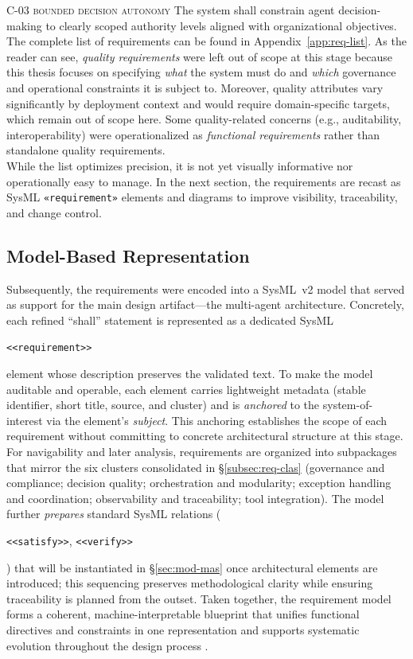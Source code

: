 \noindent \textsc{C-03 bounded decision autonomy} \quad The system shall constrain agent decision-making to clearly scoped authority levels aligned with organizational objectives. \\

The complete list of requirements can be found in Appendix~\ref{app:req-list}. As the reader can see, \emph{quality requirements} were left out of scope at this stage because this thesis focuses on specifying \emph{what} the system must do and \emph{which} governance and operational constraints it is subject to. Moreover, quality attributes vary significantly by deployment context and would require domain-specific targets, which remain out of scope here. Some quality-related concerns (e.g., auditability, interoperability) were operationalized as \emph{functional requirements} rather than standalone quality requirements. \\

While the list optimizes precision, it is not yet visually informative nor operationally easy to manage. In the next section, the requirements are recast as SysML \texttt{«requirement»} elements and diagrams to improve visibility, traceability, and change control.

\subsection{Model-Based Representation}\label{subsec:req-model}
Subsequently, the requirements were encoded into a SysML~v2 model that served as support for the main design artifact---the multi-agent architecture. Concretely, each refined \enquote{shall} statement is represented as a dedicated SysML \begin{footnotesize}\texttt{<<requirement>>}\end{footnotesize} element whose description preserves the validated text. To make the model auditable and operable, each element carries lightweight metadata (stable identifier, short title, source, and cluster) and is \emph{anchored} to the system-of-interest via the element's \emph{subject}. This anchoring establishes the scope of each requirement without committing to concrete architectural structure at this stage. For navigability and later analysis, requirements are organized into subpackages that mirror the six clusters consolidated in §\ref{subsec:req-clas} (governance and compliance; decision quality; orchestration and modularity; exception handling and coordination; observability and traceability; tool integration). The model further \emph{prepares} standard SysML relations (\begin{footnotesize}\texttt{<<satisfy>>}, \texttt{<<verify>>}\end{footnotesize}) that will be instantiated in §\ref{sec:mod-mas} once architectural elements are introduced; this sequencing preserves methodological clarity while ensuring traceability is planned from the outset. Taken together, the requirement model forms a coherent, machine-interpretable blueprint that unifies functional directives and constraints in one representation and supports systematic evolution throughout the design process \parencite{IEEEStandard1990}. %

